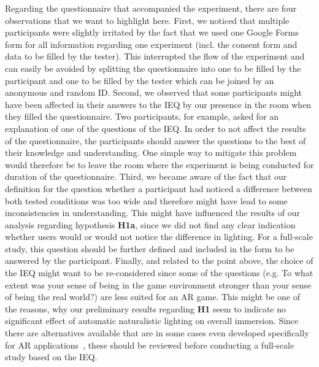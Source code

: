 \documentclass[12pt,twoside,english]{article}
\begin{document}
Regarding the questionnaire that accompanied the experiment, there are four observations that we want to highlight here.
First, we noticed that multiple participants were slightly irritated by the fact that we used one Google Forms form for all information regarding one experiment (incl. the consent form and data to be filled by the tester).
This interrupted the flow of the experiment and can easily be avoided by splitting the questionnaire into one to be filled by the participant and one to be filled by the tester which can be joined by an anonymous and random ID.
Second, we observed that some participants might have been affected in their answers to the \gls{IEQ} by our presence in the room when they filled the questionnaire.
Two participants, for example, asked for an explanation of one of the questions of the \gls{IEQ}.
In order to not affect the results of the questionnaire, the participants should answer the questions to the best of their knowledge and understanding.
One simple way to mitigate this problem would therefore be to leave the room where the experiment is being conducted for duration of the questionnaire.
Third, we became aware of the fact that our definition for the question whether a participant had noticed a difference between both tested conditions was too wide and therefore might have lead to some inconsistencies in understanding.
This might have influenced the results of our analysis regarding hypothesis \textbf{H1a}, since we did not find any clear indication whether users would or would not notice the difference in lighting.
For a full-scale study, this question should be further defined and included in the form to be answered by the participant.
Finally, and related to the point above, the choice of the \gls{IEQ} might want to be re-considered since some of the questions (e.g. To what extent was your sense of being in the game environment stronger than your sense of being the real world?) are less suited for an \gls{AR} game.
This might be one of the reasons, why our preliminary results regarding \textbf{H1} seem to indicate no significant effect of automatic naturalistic lighting on overall immersion.
Since there are alternatives available that are in some cases even developed specifically for \gls{AR} applications~\cite{georgiou_development_2017}, these should be reviewed before conducting a full-scale study based on the \gls{IEQ}.
\end{document}
